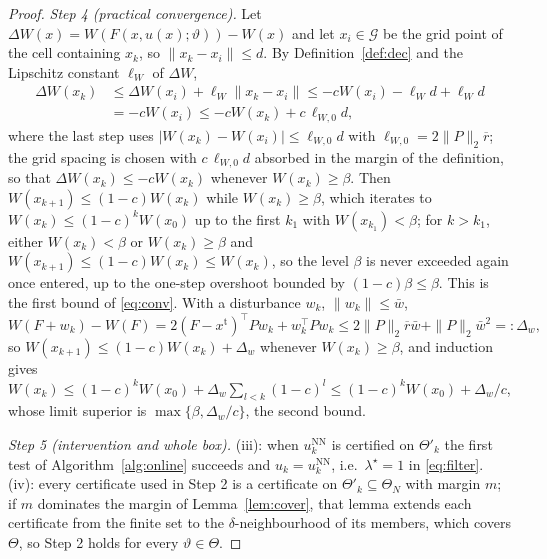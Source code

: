 \documentclass[final,5p,times,twocolumn]{elsarticle}
\begin{document}
\begin{proof}
\emph{Step 4 (practical convergence).} Let $\Delta W(x)=W(F(x,u(x);\vartheta))-W(x)$ and let $x_i\in\mathcal G$ be the grid point of the cell containing $x_k$, so $\|x_k-x_i\|\le d$. By Definition~\ref{def:dec} and the Lipschitz constant $\ell_W$ of $\Delta W$,
\begin{equation}\label{eq:dec1}
\begin{aligned}\Delta W(x_k)&\le\Delta W(x_i)+\ell_W\|x_k-x_i\|\le-cW(x_i)-\ell_Wd+\ell_Wd\\ &=-cW(x_i)\le-cW(x_k)+c\,\ell_{W,0}d,\end{aligned}
\end{equation}
where the last step uses $|W(x_k)-W(x_i)|\le\ell_{W,0}d$ with $\ell_{W,0}=2\|P\|_2\overline r$; the grid spacing is chosen with $c\,\ell_{W,0}d$ absorbed in the margin of the definition, so that $\Delta W(x_k)\le-cW(x_k)$ whenever $W(x_k)\ge\beta$. Then $W(x_{k+1})\le(1-c)W(x_k)$ while $W(x_k)\ge\beta$, which iterates to $W(x_k)\le(1-c)^kW(x_0)$ up to the first $k_1$ with $W(x_{k_1})<\beta$; for $k>k_1$, either $W(x_k)<\beta$ or $W(x_{k})\ge\beta$ and $W(x_{k+1})\le(1-c)W(x_k)\le W(x_k)$, so the level $\beta$ is never exceeded again once entered, up to the one-step overshoot bounded by $(1-c)\beta\le\beta$. This is the first bound of \eqref{eq:conv}. With a disturbance $w_k$, $\|w_k\|\le\bar w$,
\begin{equation}\label{eq:dec2}
W(F+w_k)-W(F)=2(F-x^{\mathrm t})^{\!\top}Pw_k+w_k^{\!\top}Pw_k\le2\|P\|_2\overline r\bar w+\|P\|_2\bar w^2=:\Delta_w,
\end{equation}
so $W(x_{k+1})\le(1-c)W(x_k)+\Delta_w$ whenever $W(x_k)\ge\beta$, and induction gives $W(x_k)\le(1-c)^kW(x_0)+\Delta_w\sum_{l<k}(1-c)^l\le(1-c)^kW(x_0)+\Delta_w/c$, whose limit superior is $\max\{\beta,\Delta_w/c\}$, the second bound.

\emph{Step 5 (intervention and whole box).} (iii): when $u^{\mathrm{NN}}_k$ is certified on $\Theta'_k$ the first test of Algorithm~\ref{alg:online} succeeds and $u_k=u^{\mathrm{NN}}_k$, i.e.\ $\lambda^\star=1$ in \eqref{eq:filter}. (iv): every certificate used in Step 2 is a certificate on $\Theta'_k\subseteq\Theta_N$ with margin $m$; if $m$ dominates the margin of Lemma~\ref{lem:cover}, that lemma extends each certificate from the finite set to the $\delta$-neighbourhood of its members, which covers $\Theta$, so Step 2 holds for every $\vartheta\in\Theta$.
\end{proof}
\end{document}
